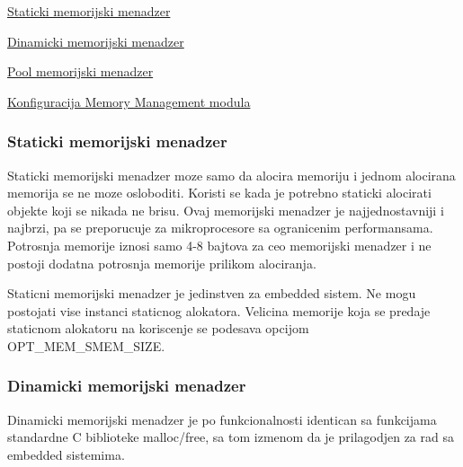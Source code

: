 \begin{DoxyItemize}
\item \hyperlink{group__mem_mem_smem}{Staticki memorijski menadzer}
\item \hyperlink{group__mem_mem_dmem}{Dinamicki memorijski menadzer}
\item \hyperlink{group__mem_mem_pmem}{Pool memorijski menadzer}
\item \hyperlink{group__mem_mem_configuration}{Konfiguracija Memory Management modula}
\end{DoxyItemize}\hypertarget{group__mem_mem_smem}{}\subsubsection{Staticki memorijski menadzer}\label{group__mem_mem_smem}
Staticki memorijski menadzer moze samo da alocira memoriju i jednom alocirana memorija se ne moze osloboditi. Koristi se kada je potrebno staticki alocirati objekte koji se nikada ne brisu. Ovaj memorijski menadzer je najjednostavniji i najbrzi, pa se preporucuje za mikroprocesore sa ogranicenim performansama. Potrosnja memorije iznosi samo 4-\/8 bajtova za ceo memorijski menadzer i ne postoji dodatna potrosnja memorije prilikom alociranja.

Staticni memorijski menadzer je jedinstven za embedded sistem. Ne mogu postojati vise instanci staticnog alokatora. Velicina memorije koja se predaje staticnom alokatoru na koriscenje se podesava opcijom O\-P\-T\-\_\-\-M\-E\-M\-\_\-\-S\-M\-E\-M\-\_\-\-S\-I\-Z\-E.\hypertarget{group__mem_mem_dmem}{}\subsubsection{Dinamicki memorijski menadzer}\label{group__mem_mem_dmem}
Dinamicki memorijski menadzer je po funkcionalnosti identican sa funkcijama standardne C biblioteke malloc/free, sa tom izmenom da je prilagodjen za rad sa embedded sistemima.

